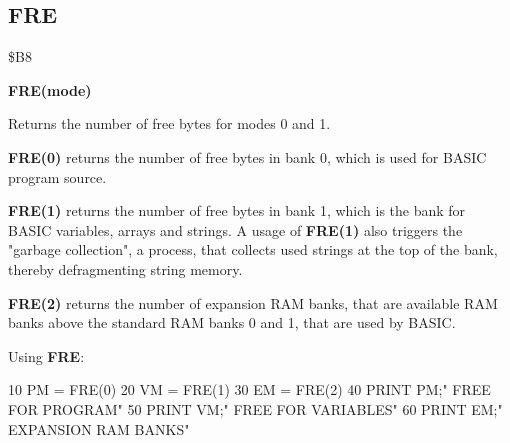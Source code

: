 
\newpage
\subsection{FRE}
\begin{description}[leftmargin=3cm,style=nextline]
\item [Token:] \$B8
\item [Format:] {\bf FRE(mode)}
\item [Usage:] Returns the number of free
               bytes for modes 0 and 1.

               {\bf FRE(0)} returns the number of free bytes in
               bank 0, which is used for BASIC program source.

               {\bf FRE(1)} returns the number of free bytes in
               bank 1, which is the bank for BASIC variables, arrays
               and strings. A usage of {\bf FRE(1)} also triggers the
               "garbage collection", a process, that collects
               used strings at the top of the bank, thereby
               defragmenting string memory.

               {\bf FRE(2)} returns the number of expansion
               RAM banks, that are available RAM banks above
               the standard RAM banks 0 and 1, that are used by BASIC.

\item [Example:] Using {\bf FRE}:
\begin{screenoutput}
10 PM = FRE(0)
20 VM = FRE(1)
30 EM = FRE(2)
40 PRINT PM;" FREE FOR PROGRAM"
50 PRINT VM;" FREE FOR VARIABLES"
60 PRINT EM;" EXPANSION RAM BANKS"
\end{screenoutput}
\end{description}


\newpage
